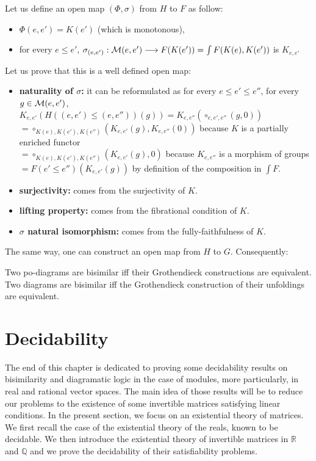 Let us define an open map $(\Phi,\sigma)$ from $H$ to $F$ as follow:
	\begin{itemize}
		\item $\Phi(e,e') = K(e')$ (which is monotonous),
		\item for every $e \leq e'$, $\sigma_{(e,e')} : \mathcal{M}(e,e') \longrightarrow F(K(e'))= \int F(K(e),K(e'))$ is $K_{e,e'}$ 
	\end{itemize}
	Let us prove that this is a well defined open map:
		\begin{itemize}
			\item \textbf{naturality of $\sigma$:} it can be reformulated as for every $e \leq e' \leq e''$, for every $g \in \mathcal{M}(e,e')$, \\$K_{e,e'}(H((e,e') \leq (e,e'')) (g)) = K_{e,e''}(\circ_{e,e',e''}(g,0))$\\$= \circ_{K(e),K(e'),K(e'')}(K_{e,e'}(g),K_{e,e''}(0))$ because $K$ is a partially enriched functor\\
			$= \circ_{K(e),K(e'),K(e'')}(K_{e,e'}(g),0)$ because $K_{e,e''}$ is a morphism of groups\\
			$=F(e' \leq e'')(K_{e,e'}(g))$ by definition of the composition in $\int F$.
			\item \textbf{surjectivity:} comes from the surjectivity of $K$.
			\item \textbf{lifting property:} comes from the fibrational condition of $K$.
			\item \textbf{$\sigma$ natural isomorphism:} comes from the fully-faithfulness of $K$.
		\end{itemize}
The same way, one can construct an open map from $H$ to $G$. Consequently:

\begin{theo}
Two po-diagrams are bisimilar iff their Grothendieck constructions are equivalent.
Two diagrams are bisimilar iff the Grothendieck construction of their unfoldings are equivalent.
\end{theo}





\section{Decidability}
\label{sec:deci}

The end of this chapter is dedicated to proving some decidability results on bisimilarity and diagramatic logic in the case of modules, more particularly, in real and rational vector spaces. The main idea of those results will be to reduce our problems to the existence of some invertible matrices satisfying linear conditions. In the present section, we focus on an existential theory of matrices. We first recall the case of the existential theory of the reals, known to be decidable. We then introduce the existential theory of invertible matrices in $\mathbb{R}$ and $\mathbb{Q}$ and we prove the decidability of their satisfiability problems.

